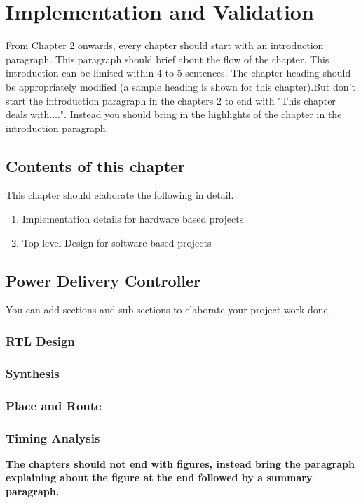 \chapter{Implementation and Validation}

\indent\indent From Chapter 2 onwards, every chapter should start with an introduction paragraph. This paragraph should brief about the flow of the chapter. This introduction can be limited within 4 to 5 sentences. The chapter heading should be appropriately modified (a sample heading is shown for this chapter).But don't start the introduction paragraph in the chapters 2 to end with "This chapter deals with....". Instead you should bring in the highlights of the chapter in the introduction paragraph. 

\section{Contents of this chapter}
This chapter should elaborate the following in detail.
\begin{enumerate}
\item Implementation details for hardware based projects
\item Top level Design for software based projects
\end{enumerate}
\section{Power Delivery Controller}
You can add sections and sub sections to elaborate your project work done.
\subsection{RTL Design}
\subsection{Synthesis}
\subsection{Place and Route}
\subsection{Timing Analysis}

\vspace{0.75cm}

 \textbf{The chapters should not end with figures, instead bring the paragraph explaining about the figure at the end followed by a summary paragraph.}
